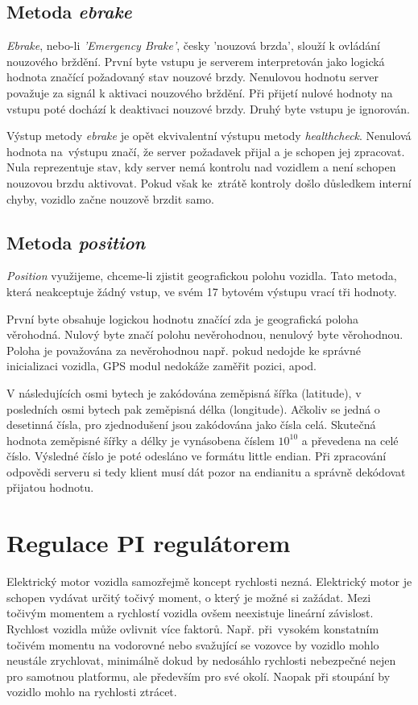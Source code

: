 \documentclass[czech, bachelor]{diploma}
\begin{document}
\subsection{Metoda \emph{ebrake}}
\emph{Ebrake}, nebo-li \emph{'Emergency Brake'}, česky 'nouzová brzda', slouží k ovládání nouzového brždění. První byte vstupu
je serverem interpretován jako logická hodnota značící požadovaný stav nouzové brzdy. Nenulovou hodnotu server považuje za signál
k aktivaci nouzového brždění. Při přijetí nulové hodnoty na vstupu poté dochází k deaktivaci nouzové brzdy. Druhý byte vstupu
je ignorován.

Výstup metody \emph{ebrake} je opět ekvivalentní výstupu metody \emph{healthcheck}. Nenulová hodnota na~výstupu značí, že server
požadavek přijal a je schopen jej zpracovat. Nula reprezentuje stav, kdy server nemá kontrolu nad vozidlem a není schopen
nouzovou brzdu aktivovat. Pokud však ke~ztrátě kontroly došlo důsledkem interní chyby, vozidlo začne nouzově brzdit samo.

\subsection{Metoda \emph{position}}

\emph{Position} využijeme, chceme-li zjistit geografickou polohu vozidla. Tato metoda, která neakceptuje žádný vstup, ve svém
17 bytovém výstupu vrací tři hodnoty.

První byte obsahuje logickou hodnotu značící zda je geografická poloha věrohodná. Nulový byte značí polohu nevěrohodnou,
nenulový byte věrohodnou. Poloha je považována za nevěrohodnou např. pokud nedojde ke správné inicializaci vozidla, GPS modul
nedokáže zaměřit pozici, apod.

V následujících osmi bytech je zakódována zeměpisná šířka (latitude), v posledních osmi bytech pak zeměpisná délka (longitude).
Ačkoliv se jedná o desetinná čísla, pro zjednodušení jsou zakódována jako čísla celá. Skutečná hodnota zeměpisné šířky a délky
je vynásobena číslem $10^{10}$ a převedena na celé číslo. Výsledné číslo je poté odesláno ve formátu little endian. Při zpracování
odpovědi serveru si tedy klient musí dát pozor na endianitu a správně dekódovat přijatou hodnotu.

\section{Regulace PI regulátorem} \label{pi-controller}
Elektrický motor vozidla samozřejmě koncept rychlosti nezná. Elektrický motor je schopen vydávat určitý točivý moment, o který
je možné si zažádat. Mezi točivým momentem a rychlostí vozidla ovšem neexistuje lineární závislost. Rychlost vozidla může ovlivnit
více faktorů. Např. při~vysokém konstatním točivém momentu na vodorovné nebo svažující se vozovce by vozidlo mohlo neustále
zrychlovat, minimálně dokud by nedosáhlo rychlosti nebezpečné nejen pro samotnou platformu, ale především pro své okolí. Naopak
při stoupání by vozidlo mohlo na rychlosti ztrácet.
\end{document}
